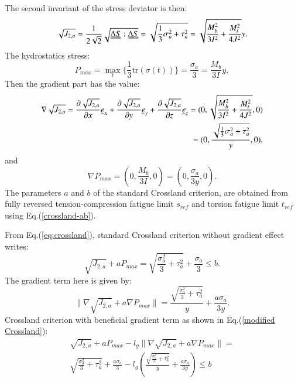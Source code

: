 \documentclass[3p,times,procedia,number]{elsarticle}
\begin{document}
The second invariant of the stress deviator is then:
\begin{equation}
\sqrt{J_{2,a}}=\frac{1}{2\sqrt{2}}\sqrt{\uuline{\Delta S}:\uuline{\Delta S}}=\sqrt{\frac{1}{3}\sigma_a^2+\tau_a^2}=\sqrt{\frac{M_b^2}{3I^2}+\frac{M_t^2}{4J^2}}y.
\end{equation}
The hydrostatics stress:
\begin{equation}
P_{max}=\max\limits_{t}\{\frac{1}{3}\textrm{tr}(\sigma(t))\}=\frac{\sigma_{a}}{3}=\frac{M_b}{3I}y ,
\end{equation}
Then the gradient part has the value:
\begin{equation}
\begin{split}
\nabla\sqrt{J_{2,a}}=\frac{\partial\sqrt{J_{2,a}}}{\partial x}\uline{e}_x+\frac{\partial\sqrt{J_{2,a}}}{\partial y}\uline{e}_y+\frac{\partial\sqrt{J_{2,a}}}{\partial z}\uline{e}_z=(0,\sqrt{\frac{M_b^2}{3I^2}+\frac{M_t^2}{4J^2}},0)\\=(0,\frac{\sqrt{\frac{1}{3}\sigma_a^2+\tau_a^2}}{y},0) ,
\end{split}
\end{equation}
and
\begin{equation}
\nabla P_{max}=(0,\frac{M_b}{3I},0)=(0,\frac{\sigma_a}{3y},0).
\end{equation}
The parameters $a$ and $b$ of the standard Crossland criterion, are obtained from fully reversed tension-compression fatigue limit $s_{ref}$  and torsion fatigue limit $t_{ref}$ using Eq.(\ref{crossland-ab}).

\noindent From Eq.(\ref{eq:crossland}), standard Crossland criterion without gradient effect writes:
\begin{equation}
\sqrt{J_{2,a}}+aP_{max}=\sqrt{\frac{\sigma_a^2}{3}+\tau_a^2}+\frac{\sigma_a}{3}\leqslant b.
\label{eqrbcross}
\end{equation}
The gradient term here is given by:
\begin{equation}
\parallel{\nabla\sqrt{J_{2,a}}}+a{\nabla P_{max}}\parallel= \frac{\sqrt{\frac{\sigma_a^2}{3}+\tau_a^2}}{y}+\frac{a\sigma_a}{3y}.
\end{equation}
Crossland criterion with beneficial gradient term as shown in Eq.(\ref{modified Crossland}):
\begin{equation}
\begin{split}
\sqrt{J_{2,a}}+aP_{max}-l_g\parallel{\nabla\sqrt{J_{2,a}}}+a\nabla{P_{max}}\parallel=\\\sqrt{\frac{\sigma_a^2}{3}+\tau_a^2}+\frac{a\sigma_a}{3}-l_g(\frac{\sqrt{\frac{\sigma_a^2}{3}+\tau_a^2}}{y}+\frac{a\sigma_a}{3y})\leqslant b
\end{split}
\end{equation}
\end{document}
